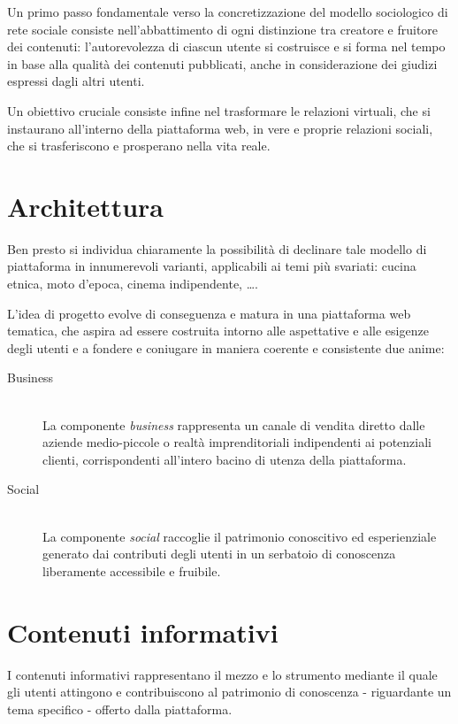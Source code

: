 \documentclass[11pt,a4paper,headsepline,hidelinks]{scrreprt} %
\begin{document}
	Un primo passo fondamentale verso la concretizzazione del modello sociologico di rete sociale consiste nell'abbattimento di ogni distinzione tra creatore e fruitore dei contenuti: l'autorevolezza di ciascun utente si costruisce e si forma nel tempo in base alla qualità dei contenuti pubblicati, anche in considerazione dei giudizi espressi dagli altri utenti.

	Un obiettivo cruciale consiste infine nel trasformare le relazioni virtuali, che si instaurano all'interno della piattaforma web, in vere e proprie relazioni sociali, che si trasferiscono e prosperano nella vita reale.


	\section{Architettura}
	\label{sec:progetto:architettura}
	Ben presto si individua chiaramente la possibilità di declinare tale modello di piattaforma in innumerevoli varianti, applicabili ai temi più svariati: cucina etnica, moto d'epoca, cinema indipendente, \ldots .

	L'idea di progetto evolve di conseguenza e matura in una piattaforma web tematica, che aspira ad essere costruita intorno alle aspettative e alle esigenze degli utenti e a fondere e coniugare in maniera coerente e consistente due anime:
	\begin{description}
	\item[Business] \hfill \\
	La componente \textit{business} rappresenta un canale di vendita diretto dalle aziende medio-piccole o realtà imprenditoriali indipendenti ai potenziali clienti, corrispondenti all'intero bacino di utenza della piattaforma.
	\item[Social] \hfill \\
	La componente \textit{social} raccoglie il patrimonio conoscitivo ed esperienziale generato dai contributi degli utenti in un serbatoio di conoscenza liberamente accessibile e fruibile.
	\end{description}

	\section{Contenuti informativi}
	\label{sec:progetto:contenuti}
	I contenuti informativi rappresentano il mezzo e lo strumento mediante il quale gli utenti attingono e contribuiscono al patrimonio di conoscenza - riguardante un tema specifico - offerto dalla piattaforma.
\end{document}
